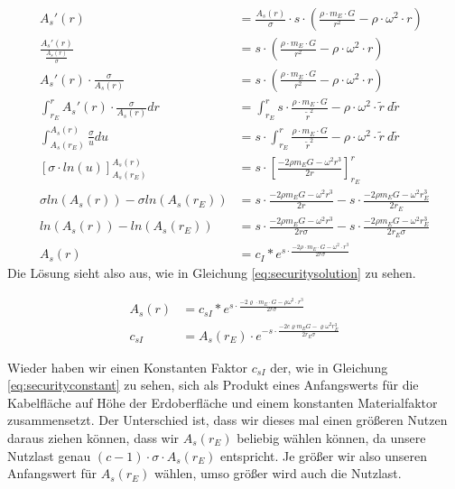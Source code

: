 \documentclass[a4paper, 10pt]{report}
\begin{document}
\begin{align*}
A_s'(r) &= \frac{A_s(r)}{\sigma} \cdot s \cdot (\frac{\rho\cdot m_E \cdot G}{r^2} - \rho \cdot \omega^2 \cdot r)\\
\frac{A_s'(r)}{\frac{A_s(r)}{\sigma}} &= s \cdot(\frac{\rho\cdot m_E \cdot G}{r^2} - \rho \cdot \omega^2 \cdot r)\\
A_s'(r) \cdot \frac{\sigma}{A_s(r)} &= s \cdot (\frac{\rho\cdot m_E \cdot G}{r^2} - \rho \cdot \omega^2 \cdot r)\\
\int_{r_E}^{r} A_s'(r) \cdot \frac{\sigma}{A_s(r)} dr &=  \int_{r_E}^{r} s \cdot \frac{\rho\cdot m_E \cdot G}{\tilde{r}^2} - \rho \cdot \omega^2 \cdot \tilde{r} \ d\tilde{r}\\
\int_{A_s(r_E)}^{A_s(r)} \frac{\sigma}{u} du &=  s \cdot \int_{r_E}^{r} \frac{\rho\cdot m_E \cdot G}{\tilde{r}^2} - \rho \cdot \omega^2 \cdot \tilde{r} \ d\tilde{r}\\
[\sigma \cdot ln(u)]_{A_s(r_E)}^{A_s(r)} &=  s \cdot [\frac{-2\rho m_E G - \omega^2 r^3}{2 r}]_{r_E}^{r}\\
\sigma ln(A_s(r)) - \sigma ln(A_s(r_E)) &= s \cdot \frac{-2\rho m_E G - \omega^2 r^3}{2 r} - s \cdot \frac{-2\rho m_E G - \omega^2 r_E^3}{2 r_E}\\
ln(A_s(r)) - ln(A_s(r_E)) &= s \cdot \frac{-2\rho m_E G - \omega^2 r^3}{2 r \sigma} - s \cdot \frac{-2\rho m_E G - \omega^2 r_E^3}{2 r_E \sigma}\\
A_s(r) &= c_I * e^{s \cdot \frac{-2\rho \cdot m_E \cdot G - \omega^2 \cdot r^3}{2 r \sigma}}
\end{align*}
Die Lösung sieht also aus, wie in Gleichung \ref{eq:securitysolution} zu sehen.

\begin{align}
A_s(r) &= c_{sI} * e^{s \cdot \frac{-2\varrho \cdot m_E \cdot G - \rho \omega^2 \cdot r^3}{2 r \sigma}}\label{eq:securitysolution}\\
c_{sI} &= A_s(r_E) \cdot e^{- s \cdot \frac{-2 c \varrho m_E G - \varrho \omega^2 r_E^3}{2 r_E \sigma}}
\label{eq:securityconstant}
\end{align}

Wieder haben wir einen Konstanten Faktor $c_{sI}$ der, wie in Gleichung \ref{eq:securityconstant} zu sehen, sich als Produkt eines Anfangswerts für die Kabelfläche auf Höhe der Erdoberfläche und einem konstanten Materialfaktor zusammensetzt. Der Unterschied ist, dass wir dieses mal einen größeren Nutzen daraus ziehen können, dass wir $A_s(r_E)$ beliebig wählen können, da unsere Nutzlast genau $(c-1)\cdot \sigma \cdot A_s(r_E)$ entspricht. Je größer wir also unseren Anfangswert für $A_s(r_E)$ wählen, umso größer wird auch die Nutzlast.
\end{document}
